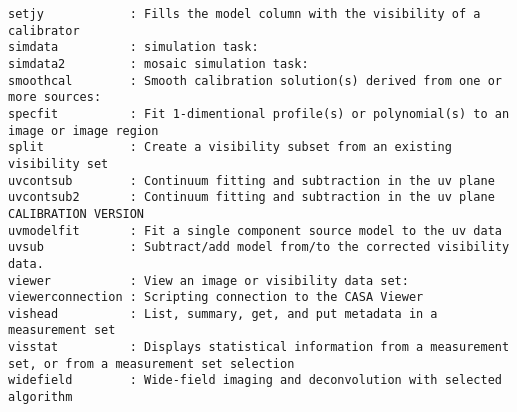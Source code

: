 \begin{verbatim}
setjy            : Fills the model column with the visibility of a calibrator
simdata          : simulation task:
simdata2         : mosaic simulation task:
smoothcal        : Smooth calibration solution(s) derived from one or more sources:
specfit          : Fit 1-dimentional profile(s) or polynomial(s) to an image or image region
split            : Create a visibility subset from an existing visibility set
uvcontsub        : Continuum fitting and subtraction in the uv plane
uvcontsub2       : Continuum fitting and subtraction in the uv plane CALIBRATION VERSION
uvmodelfit       : Fit a single component source model to the uv data
uvsub            : Subtract/add model from/to the corrected visibility data.
viewer           : View an image or visibility data set:
viewerconnection : Scripting connection to the CASA Viewer
vishead          : List, summary, get, and put metadata in a measurement set
visstat          : Displays statistical information from a measurement set, or from a measurement set selection
widefield        : Wide-field imaging and deconvolution with selected algorithm
\end{verbatim}
\normalsize

